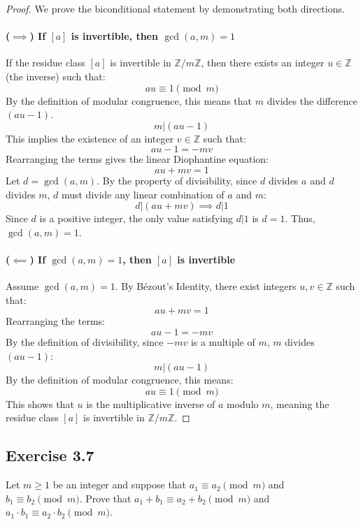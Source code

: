 \begin{proof}
We prove the biconditional statement by demonstrating both directions.

\paragraph{($\implies$) If $[a]$ is invertible, then $\gcd(a, m)=1$}
If the residue class $[a]$ is invertible in $\mathbb{Z}/m\mathbb{Z}$, then there exists an integer $u \in \mathbb{Z}$ (the inverse) such that:
$$ au \equiv 1 \pmod{m} $$
By the definition of modular congruence, this means that $m$ divides the difference $(au - 1)$.
$$ m | (au - 1) $$
This implies the existence of an integer $v \in \mathbb{Z}$ such that:
$$ au - 1 = -mv $$
Rearranging the terms gives the linear Diophantine equation:
$$ au + mv = 1 $$
Let $d = \gcd(a, m)$. By the property of divisibility, since $d$ divides $a$ and $d$ divides $m$, $d$ must divide any linear combination of $a$ and $m$:
$$ d | (au + mv) \implies d | 1 $$
Since $d$ is a positive integer, the only value satisfying $d|1$ is $d=1$.
Thus, $\gcd(a, m) = 1$.

\paragraph{($\impliedby$) If $\gcd(a, m)=1$, then $[a]$ is invertible}
Assume $\gcd(a, m) = 1$. By Bézout's Identity, there exist integers $u, v \in \mathbb{Z}$ such that:
$$ au + mv = 1 $$
Rearranging the terms:
$$ au - 1 = -mv $$
By the definition of divisibility, since $-mv$ is a multiple of $m$, $m$ divides $(au - 1)$:
$$ m | (au - 1) $$
By the definition of modular congruence, this means:
$$ au \equiv 1 \pmod{m} $$
This shows that $u$ is the multiplicative inverse of $a$ modulo $m$, meaning the residue class $[a]$ is invertible in $\mathbb{Z}/m\mathbb{Z}$.
\end{proof}
\newpage
\subsection*{Exercise 3.7}
Let $m \ge 1$ be an integer and suppose that $a_1 \equiv a_2 \pmod{m}$ and $b_1 \equiv b_2 \pmod{m}$. Prove that $a_1+b_1 \equiv a_2+b_2 \pmod{m}$ and $a_1 \cdot b_1 \equiv a_2 \cdot b_2 \pmod{m}$.


